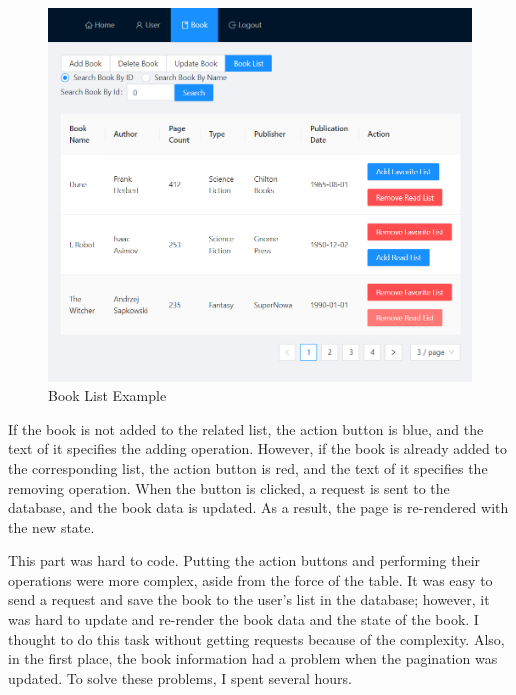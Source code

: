 \begin{minipage}{.49\textwidth}
  \begin{figure}[H]
    \centering
    \includegraphics[width=\linewidth]{img/front-end/book-list-example.png}
    \caption{Book List Example}
  \end{figure}
\end{minipage}

If the book is not added to the related list, the action button is blue, and the text of it specifies the adding operation. However, if the book is already added to the corresponding list, the action button is red, and the text of it specifies the removing operation. When the button is clicked, a request is sent to the database, and the book data is updated. As a result, the page is re-rendered with the new state.

This part was hard to code. Putting the action buttons and performing their operations were more complex, aside from the force of the table. It was easy to send a request and save the book to the user's list in the database; however, it was hard to update and re-render the book data and the state of the book. I thought to do this task without getting requests because of the complexity. Also, in the first place, the book information had a problem when the pagination was updated. To solve these problems, I spent several hours.
